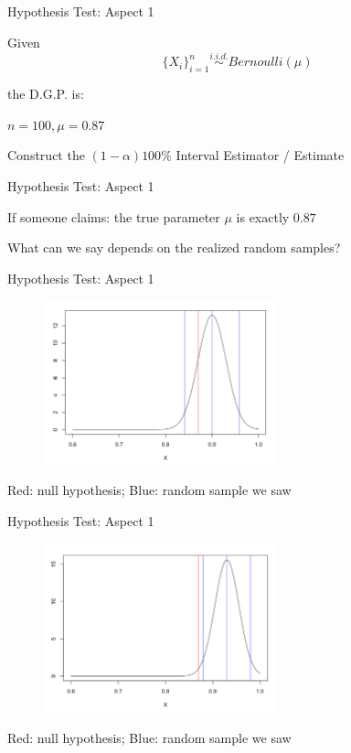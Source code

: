 \documentclass[12pt]{beamer}
\begin{document}
\begin{frame}[fragile]{Hypothesis Test: Aspect 1}

Given
$$\{X_i\}_{i=1}^n \stackrel{i.i.d.}{\sim} Bernoulli(\mu)$$

the D.G.P. is:

$n=100, \mu = 0.87$

Construct the $(1-\alpha)100\%$ Interval Estimator / Estimate

\end{frame}


\begin{frame}[fragile]{Hypothesis Test: Aspect 1}

If someone claims: the true parameter $\mu$ is exactly $0.87$

What can we say depends on the realized random samples?

\end{frame}

\begin{frame}[fragile]{Hypothesis Test: Aspect 1}

	\begin{figure}
		\begin{center}
			\includegraphics[width=0.6\textwidth]{figure/f04.png}
		\end{center}
	\end{figure}

Red: null hypothesis; Blue: random sample we saw
\end{frame}

\begin{frame}[fragile]{Hypothesis Test: Aspect 1}

	\begin{figure}
		\begin{center}
			\includegraphics[width=0.6\textwidth]{figure/f05.png}
		\end{center}
	\end{figure}
Red: null hypothesis; Blue: random sample we saw
\end{frame}
\end{document}
